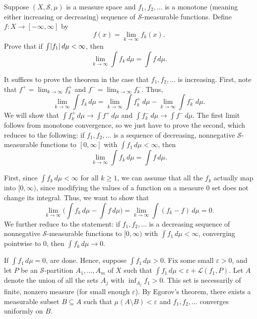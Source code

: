 \documentclass[11pt,oneside]{book}
\begin{document}
\begin{exercise}
    Suppose $(X, \mathscr{S}, \mu)$ is a measure space and $f_1, f_2, \ldots$ is a monotone (meaning either increasing or decreasing) sequence of $\mathscr{S}$-measurable functions. Define $f: X \to [-\infty, \infty]$ by \[f(x) = \lim_{k \to \infty} f_k(x).\] Prove that if $\int \lvert f_1\rvert \, d\mu < \infty$, then \[\lim_{k\to\infty} \int f_k \, d\mu = \int f \, d\mu.\]
\end{exercise}

\begin{solution}
    It suffices to prove the theorem in the case that $f_1, f_2, \ldots$ is increasing. First, note that $f^+ = \lim_{k \to \infty} f_k^+$ and $f^- = \lim_{k \to \infty} f_k^-$. Thus, \[\lim_{k \to \infty} \int f_k \, d\mu = \lim_{k \to \infty} \int f_k^+ \, d\mu - \lim_{k \to \infty} \int f_k^- \, d\mu.\] We will show that $\int f_k^+ \, d\mu \to \int f^+ \, d\mu$ and $\int f_k^- \, d\mu \to \int f^- \, d\mu$. The first limit follows from monotone convergence, so we just have to prove the second, which reduces to the following: if $f_1, f_2, \ldots$ is a sequence of decreasing, nonnegative $\mathscr{S}$-measurable functions to $[0, \infty]$ with $\int f_1 \, d\mu < \infty$, then \[\lim_{k \to \infty} \int f_k \, d\mu = \int f \, d\mu.\]

    First, since $\int f_k \, d\mu < \infty$ for all $k \geq 1$, we can assume that all the $f_k$ actually map into $[0, \infty)$, since modifying the values of a function on a measure $0$ set does not change its integral. Thus, we want to show that \[\lim_{k \to \infty} \bigg( \int f_k \, d\mu - \int f \, d\mu \bigg) = \lim_{k \to \infty} \int (f_k - f) \, d\mu = 0.\] We further reduce to the statement: if $f_1, f_2, \ldots$ is a decreasing sequence of nonnegative $\mathscr{S}$-measurable functions to $[0, \infty)$ with $\int f_1 \, d\mu < \infty$, converging pointwise to $0$, then $\int f_k \, d\mu \to 0$.

    If $\int f_1 \, d\mu = 0$, are done. Hence, suppose $\int f_1 \, d\mu > 0$. Fix some small $\varepsilon > 0$, and let $P$ be an $\mathscr{S}$-partition $A_1, \ldots, A_m$ of $X$ such that $\int f_1 \, d\mu < \varepsilon + \mathscr{L}(f_1, P)$. Let $A$ denote the union of all the sets $A_j$ with $\inf_{A_j} f_1 > 0$. This set is necessarily of finite, nonzero measure (for small enough $\varepsilon$). By Egorov's theorem, there exists a measurable subset $B \subseteq A$ such that $\mu(A\setminus B) < \varepsilon$ and $f_1, f_2, \ldots$ converges uniformly on $B$.


\end{solution}
\end{document}
